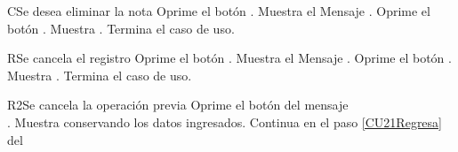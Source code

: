 \begin{UCtrayectoriaA}{C}{Se desea eliminar la nota}
    \UCpaso[\UCactor] Oprime el botón .
    \UCpaso Muestra el Mensaje \textbf{}.
    \UCpaso[\UCactor] Oprime el botón . 
    \UCpaso Muestra .
    \UCpaso Termina el caso de uso.
\end{UCtrayectoriaA}

\begin{UCtrayectoriaA}{R}{Se cancela el registro}
	\UCpaso[\UCactor] Oprime el botón .
	\UCpaso Muestra el Mensaje \textbf{}.
    \UCpaso[\UCactor] Oprime el botón . 
	\UCpaso Muestra .
	\UCpaso Termina el caso de uso.
\end{UCtrayectoriaA}

\begin{UCtrayectoriaA}{R2}{Se cancela la operación previa}
    \UCpaso[\UCactor] Oprime el botón  del mensaje
        \\\textbf{}.
    \UCpaso Muestra  conservando los datos ingresados.
    \UCpaso Continua en el paso \ref{CU21Regresa} del 
\end{UCtrayectoriaA}
